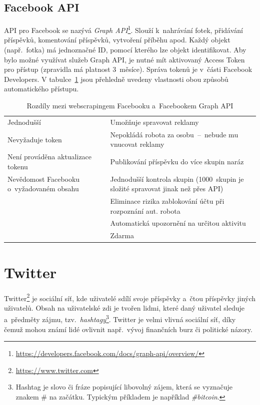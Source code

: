 \subsection*{Facebook API}
API pro Facebook se nazývá \textit{Graph API}\footnote{\href{https://developers.facebook.com/docs/graph-api/overview/}{https://developers.facebook.com/docs/graph-api/overview/}}. Slouží k~nahrávání fotek, přidávání příspěvků, komentování příspěvků, vytvoření příběhu apod. Každý objekt (např.~fotka) má jednoznačné ID, pomocí kterého lze objekt identifikovat. Aby bylo možné využívat služeb Graph API, je nutné mít aktivovaný Access Token pro přístup (zpravidla má platnost 3~měsíce). Správa tokenů je v~části Facebook Developers.
V tabulce~\ref{tab:FB_API_vs_webscraping} jsou přehledně uvedeny vlastnosti obou způsobů automatického přístupu.

\begin{table}[H]
\begin{tabularx}{\linewidth}{
    |>{\hsize=1\hsize}X|%
    >{\hsize=1\hsize}X|%
  }
\hline

\multicolumn{1}{|c|}{\textbf{Webscraping}} & \multicolumn{1}{|c|}{\textbf{Facebook Graph API}} \\ \hline
Jednodušší & Umožňuje spravovat reklamy \\ \hline
Nevyžaduje token & Nepokládá robota za osobu~--~nebude mu vnucovat reklamy \\ \hline
Není prováděna aktualizace tokenu & Publikování příspěvku do více skupin naráz \\ \hline
Nevědomost Facebooku o~vyžadovaném obsahu &  Jednodušší kontrola skupin (1000~skupin je složité spravovat jinak než přes API)\\ \hline
& Eliminace rizika zablokování účtu při rozpoznání aut. robota \\ \hline
& Automatická upozornění na určitou aktivitu \\ \hline
& Zdarma \\ \hline
\end{tabularx}

\caption{Rozdíly mezi webscrapingem Facebooku a~Facebookem Graph API}
\label{tab:FB_API_vs_webscraping}
\end{table}

\section{Twitter}
Twitter\footnote{\href{https://www.twitter.com}{https://www.twitter.com}} je sociální síť, kde uživatelé sdílí svoje příspěvky a~čtou příspěvky jiných uživatelů. Obsah na uživatelské zdi je tvořen lidmi, které daný uživatel sleduje a~předměty zájmu, tzv.~\textit{hashtagy}\footnote{Hashtag je slovo či fráze popisující libovolný zájem, která se vyznačuje znakem \# na začátku. Typickým příkladem je například \textit{\#bitcoin}.}. Twitter je velmi vlivná sociální síť, díky čemuž mohou známí lidé ovlivnit např.~vývoj finančních burz či politické názory.

